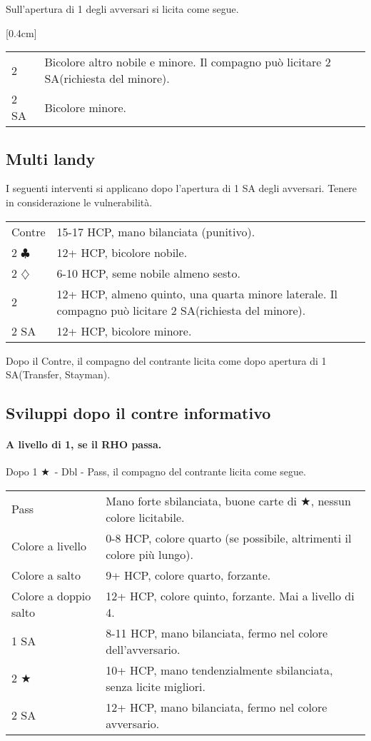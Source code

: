 \documentclass[a4paper,10pt]{article}
\renewcommand{\c}{$\clubsuit$\xspace}
\renewcommand{\d}{$\diamondsuit$\xspace}
\renewcommand{\j}{$\bigstar$\xspace}
\newcommand{\sa}{SA\xspace}
\newcommand{\M}{\raisebox{-1.2pt}{$^\heartsuit \mkern-6mu$} \raisebox{1.2pt}{$\mkern-6mu _\spadesuit$}\xspace}%
\newcommand{\smallspace}{\vskip0.3cm}
\renewcommand{\tabcolsep}{0.3cm}
\newenvironment{twocol}
  {\smallspace\noindent\begin{tabular}{l p{0.78\textwidth}}}
  {\end{tabular}\smallspace}
\newcommand{\biddingtable}[2][0.4cm]{
  \needspace{1cm}
  \marginnote{
    \scriptsize{
    \def\arraystretch{1.5}
    \renewcommand{\tabcolsep}{0.1cm}
    \begin{tabular}{|>{\centering\arraybackslash}p{0.6cm}>{\centering\arraybackslash}p{0.6cm}>{\centering\arraybackslash}p{0.6cm}>{\centering\arraybackslash}p{0.6cm}|}
      \hline
      #2
    \end{tabular}
    }
  }[#1]
}
\begin{document}
Sull'apertura di 1 \M degli avversari si licita come segue.

\biddingtable{1 \M & * &&}
\begin{twocol}
  2 \M & Bicolore altro nobile e minore. Il compagno può licitare 2 \sa (richiesta del minore).\\
  2 \sa & Bicolore minore.
\end{twocol}

\subsection{Multi landy}

I seguenti interventi si applicano dopo l'apertura di 1 \sa degli avversari. Tenere in considerazione le vulnerabilità.
\begin{twocol}
 Contre & 15-17 HCP, mano bilanciata (punitivo).\\
 2 \c & 12+ HCP, bicolore nobile.\\
 2 \d & 6-10 HCP, seme nobile almeno sesto.\\
 2 \M & 12+ HCP, \M almeno quinto, una quarta minore laterale. Il compagno può licitare 2 \sa (richiesta del minore).\\
 2 \sa & 12+ HCP, bicolore minore.\\
\end{twocol}

Dopo il Contre, il compagno del contrante licita come dopo apertura di 1 \sa (Transfer, Stayman).


\subsection{Sviluppi dopo il contre informativo}

\paragraph{A livello di 1, se il RHO passa.} Dopo 1 \j\ - Dbl - Pass, il compagno del contrante licita come segue.

\begin{twocol}
	Pass & Mano forte sbilanciata, buone carte di \j, nessun colore licitabile. \\
	Colore a livello & 0-8 HCP, colore quarto (se possibile, altrimenti il colore più lungo). \\
	Colore a salto & 9+ HCP, colore quarto, forzante. \\
	Colore a doppio salto & 12+ HCP, colore quinto, forzante. Mai a livello di 4. \\
	1 \sa & 8-11 HCP, mano bilanciata, fermo nel colore dell'avversario. \\
	2 \j & 10+ HCP, mano tendenzialmente sbilanciata, senza licite migliori. \\
	2 \sa & 12+ HCP, mano bilanciata, fermo nel colore avversario. \\
\end{twocol}
\end{document}
